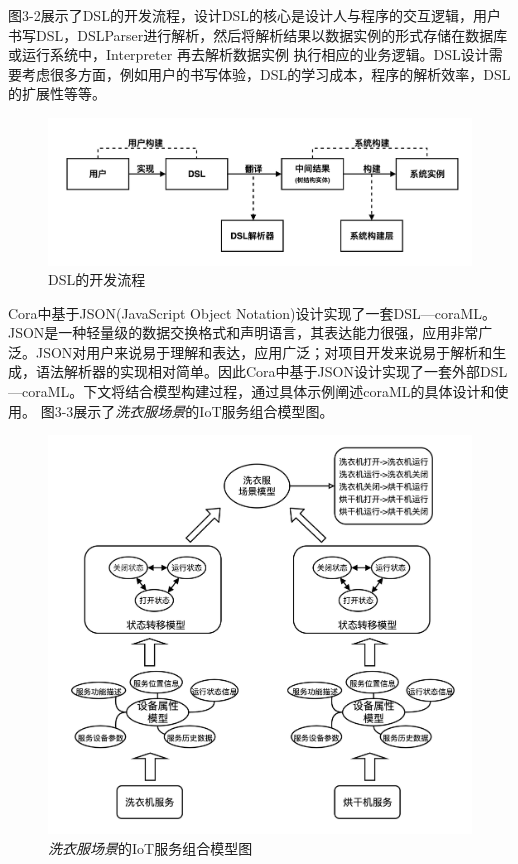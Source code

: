 \documentclass[winfonts,master,twoside]{njuthesis}
\begin{document}

图3-2展示了DSL的开发流程，设计DSL的核心是设计人与程序的交互逻辑，用户书写DSL，DSLParser进行解析，然后将解析结果以数据实例的形式存储在数据库或运行系统中，Interpreter 再去解析数据实例 执行相应的业务逻辑。DSL设计需要考虑很多方面，例如用户的书写体验，DSL的学习成本，程序的解析效率，DSL的扩展性等等\cite{dsldesign}。

\begin{figure}
	\centering
	\includegraphics[width=1.0\textwidth]{figure/3-model-driven/dsl_lifecycle.png}
	\caption{DSL的开发流程}
	\label{ontransact-impl}
\end{figure}

Cora中基于JSON(JavaScript Object Notation)\cite{json}设计实现了一套DSL—coraML。JSON是一种轻量级的数据交换格式和声明语言，其表达能力很强，应用非常广泛。JSON对用户来说易于理解和表达，应用广泛；对项目开发来说易于解析和生成，语法解析器的实现相对简单。因此Cora中基于JSON设计实现了一套外部DSL—coraML。下文将结合模型构建过程，通过具体示例阐述coraML的具体设计和使用。
图3-3展示了\textit{洗衣服场景}的IoT服务组合模型图。
\begin{figure}
	\centering
	\includegraphics[width=1.0\textwidth]{figure/3-model-driven/example.png}
	\caption{\textit{洗衣服场景}的IoT服务组合模型图}
	\label{ontransact-impl}
\end{figure}
\end{document}
